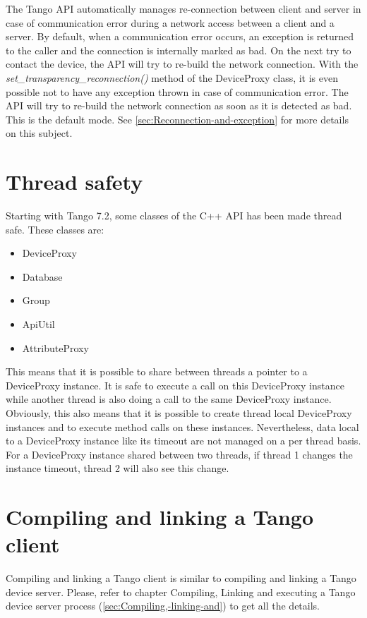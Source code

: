 The Tango API automatically manages re-connection between client and
server in case of communication error during a network access between
a client and a server. By default, when a communication error occurs,
an exception is returned to the caller and the connection is internally
marked as bad. On the next try to contact the device, the API will
try to re-build the network connection. With the \emph{set\_transparency\_reconnection()}
method of the DeviceProxy class, it is even possible
not to have any exception thrown in case of communication error. The
API will try to re-build the network connection as soon as it is detected
as bad. This is the default mode. See \ref{sec:Reconnection-and-exception}
for more details on this subject.


\section{Thread safety}

Starting with Tango 7.2, some classes of the C++ API has been made
thread safe. These classes are:
\begin{itemize}
\item DeviceProxy
\item Database
\item Group
\item ApiUtil
\item AttributeProxy
\end{itemize}
This means that it is possible to share between threads a pointer
to a DeviceProxy instance. It is safe to execute a call on this DeviceProxy
instance while another thread is also doing a call to the same DeviceProxy
instance. Obviously, this also means that it is possible to create
thread local DeviceProxy instances and to execute method calls on
these instances. Nevertheless, data local to a DeviceProxy instance
like its timeout are not managed on a per thread basis. For a DeviceProxy
instance shared between two threads, if thread 1 changes the instance
timeout, thread 2 will also see this change.


\section{Compiling and linking a Tango client}

Compiling and linking a Tango client is similar to compiling and linking
a Tango device server. Please, refer to chapter \textquotedbl{}Compiling,
Linking and executing a Tango device server process\textquotedbl{}
(\ref{sec:Compiling,-linking-and}) to get all the details.

